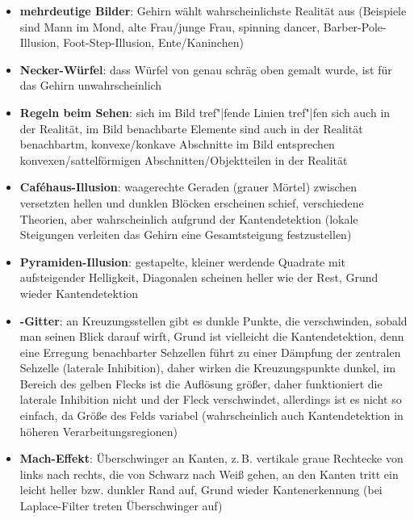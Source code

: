 \linie
\pagebreak
\begin{itemize}
    \item
    \textbf{mehrdeutige Bilder}:
    Gehirn wählt wahrscheinlichste Realität aus
    (Beispiele sind Mann im Mond, alte Frau/junge Frau, spinning dancer,
    Barber-Pole-Illusion, Foot-Step-Illusion, Ente/Kaninchen)
    
    \item
    \textbf{Necker-Würfel}:
    dass Würfel von genau schräg oben gemalt wurde, ist für das
    Gehirn unwahrscheinlich
    
    \item
    \textbf{Regeln beim Sehen}:
    sich im Bild tref"|fende Linien tref"|fen sich auch in der Realität,
    im Bild benachbarte Elemente sind auch in der Realität benachbartm,
    konvexe/konkave Abschnitte im Bild entsprechen konvexen/sattelförmigen
    Abschnitten/Objektteilen in der Realität
\end{itemize}
\linie
\begin{itemize}
    \item
    \textbf{Caféhaus-Illusion}:
    waagerechte Geraden (grauer Mörtel) zwischen versetzten hellen und dunklen
    Blöcken erscheinen schief, verschiedene Theorien,
    aber wahrscheinlich aufgrund der Kantendetektion
    (lokale Steigungen verleiten das Gehirn eine Gesamtsteigung festzustellen)
    
    \item
    \textbf{Pyramiden-Illusion}:
    gestapelte, kleiner werdende Quadrate mit aufsteigender Helligkeit,
    Diagonalen scheinen heller wie der Rest,
    Grund wieder Kantendetektion
\end{itemize}
\linie
\begin{itemize}
    \item
    \textbf{-Gitter}:
    an Kreuzungsstellen gibt es dunkle Punkte, die verschwinden, sobald man
    seinen Blick darauf wirft,
    Grund ist vielleicht die Kantendetektion,
    denn eine Erregung benachbarter Sehzellen führt zu einer Dämpfung
    der zentralen Sehzelle (laterale Inhibition), daher wirken die
    Kreuzungspunkte dunkel,
    im Bereich des gelben Flecks ist die Auflösung größer, daher funktioniert
    die laterale Inhibition nicht und der Fleck verschwindet,
    allerdings ist es nicht so einfach, da Größe des Felds variabel
    (wahrscheinlich auch Kantendetektion in höheren Verarbeitungsregionen)
    
    \item
    \textbf{Mach-Effekt}:
    Überschwinger an Kanten,
    z.\,B. vertikale graue Rechtecke von links nach rechts, die
    von Schwarz nach Weiß gehen,
    an den Kanten tritt ein leicht heller bzw. dunkler Rand auf,
    Grund wieder Kantenerkennung
    (bei Laplace-Filter treten Überschwinger auf)
\end{itemize}
